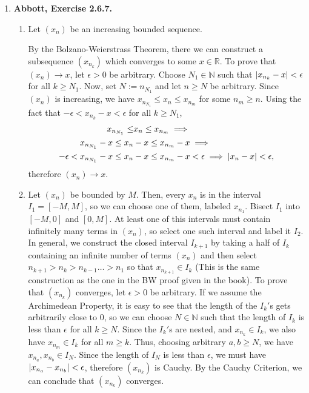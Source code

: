 \documentclass{article}
\DeclarePairedDelimiter\abs{\lvert}{\rvert}
\newcommand{\N}{\mathbb{N}}
\newcommand{\R}{\mathbb{R}}
\newcommand{\ra}{\rightarrow}
\newcommand{\exc}[2][Abbott]{\item \textbf{#1, Exercise #2.}}
\newcommand{\lep}[1][L]{#1et $\epsilon > 0$ be arbitrary}
\begin{document}
\begin{enumerate}
\begin{enumerate}
        \item 
    \end{enumerate}
    
    \exc{2.6.7}
    \begin{enumerate}
        \item Let $(x_n)$ be an increasing bounded sequence. 
        
        By the Bolzano-Weierstrass Theorem, there we can construct a subsequence $(x_{n_k})$ which converges to some $x \in \R$. To prove that $(x_n) \ra x$, \lep[l]. Choose $N_1 \in \N$ such that $\abs*{x_{n_k}-x} < \epsilon$ for all $k \geq N_1$. Now, set $N := n_{N_1}$ and let $n \geq N$ be arbitrary. Since $(x_n)$ is increasing, we have $x_{n_{N_1}} \leq x_n \leq x_{n_m}$ for some $n_m \geq n$. Using the fact that $-\epsilon< x_{n_k} -x < \epsilon$ for all $k \geq N_1$, 
        \begin{align*}
            x_{n_{N_1}} \leq &x_n \leq x_{n_m} \implies \\
            x_{n_{N_1}}-x \leq x_n&-x \leq x_{n_m}-x \implies \\
            -\epsilon < x_{n_{N_1}}-x \leq x_n&-x \leq x_{n_m}-x < \epsilon \implies
            \abs*{x_n-x} < \epsilon,
        \end{align*} therefore $(x_n) \ra x$.
        
        \item Let $(x_n)$ be bounded by $M$. Then, every $x_n$ is in the interval $I_1 = [-M,M]$, so we can choose one of them, labeled $x_{n_1}$. Bisect $I_1$ into $[-M, 0]$ and $[0, M]$. At least one of this intervals must contain infinitely many terms in $(x_n)$, so select one such interval and label it $I_2$. In general, we construct the closed interval $I_{k+1}$ by taking a half of $I_k$ containing an infinite number of terms $(x_n)$ and then select $n_{k+1} > n_k > n_{k-1} \dots > n_1$ so that $x_{n_{k+1}} \in I_k$ (This is the same construction as the one in the BW proof given in the book). To prove that $(x_{n_k})$ converges, \lep[l]. If we assume the Archimedean Property, it is easy to see that the length of the $I_k'$s gets arbitrarily close to $0$, so we can choose $N \in \N$ such that the length of $I_k$ is less than $\epsilon$ for all $k \geq N$. Since the $I_k'$s are nested, and $x_{n_k} \in I_k$, we also have $x_{n_m} \in I_k$ for all $m \geq k$. Thus, choosing arbitrary $a,b \geq N$, we have $x_{n_a},x_{n_b} \in I_N$. Since the length of $I_N$ is less than $\epsilon$, we must have $\abs*{x_{n_a}-x_{n_b}} < \epsilon$, therefore $(x_{n_k})$ is Cauchy. By the Cauchy Criterion, we can conclude that $(x_{n_k})$ converges.
        

\end{enumerate}
\end{enumerate}
\end{document}

